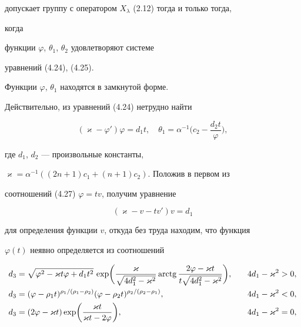 допускает группу с оператором $X_\lambda$ (2.12) тогда и только тогда,


когда


функции $\varphi$, $\theta_1$, $\theta_2$ удовлетворяют системе


уравнений (4.24), (4.25).





Функции $\varphi$, $\theta_1$ находятся в замкнутой форме.


Действительно, из уравнений (4.24) нетрудно найти


\begin{equation}


(\varkappa-\varphi')\varphi=d_1t,\quad


\theta_1=\alpha^{-1}\biggl(c_2-\frac{d_2t}{\varphi}\biggr),


\tag{4.27}


\end{equation}


где $d_1$, $d_2$ --- произвольные константы,


$\varkappa=\alpha^{-1}((2n+1)c_1+(n+1)c_2)$. Положив в первом из


соотношений (4.27) $\varphi=tv$, получим уравнение


$$


(\varkappa-v-tv')v=d_1


$$


для определения функции $v$, откуда без труда находим, что функция


$\varphi(t)$ неявно определяется из соотношений


\begin{alignat*}{2}


& d_3=\sqrt{\varphi^2-\varkappa t\varphi+d_1t^2}\,


\exp\biggl(\frac{\varkappa}{\sqrt{4d^2_1-\varkappa^2}}


\arctg\frac{2\varphi-\varkappa t}


{t\sqrt{4d^2_1-\varkappa^2}}\biggr), &\quad &4d_1-


\varkappa^2>0,\\


& d_3=(\varphi-\rho_1t)^{\rho_1/(\rho_1-\rho_2)}


(\varphi-\rho_2t)^{\rho_2/(\rho_2-\rho_1)}, &\quad


&4d_1-\varkappa^2<0,\\


& d_3=(2\varphi-\varkappa t)\exp\biggl(


\frac{\varkappa t}{\varkappa t-2\varphi}\biggr), &\quad


& 4d_1-\varkappa^2=0,


\end{alignat*}


